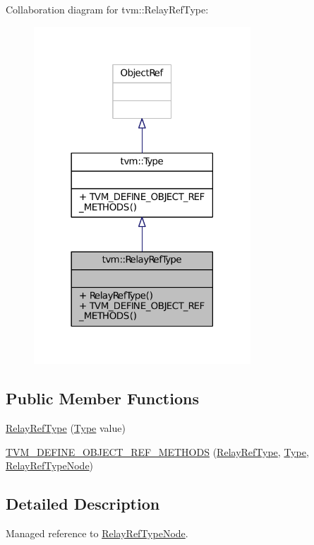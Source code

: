 Collaboration diagram for tvm\+:\+:Relay\+Ref\+Type\+:
\nopagebreak
\begin{figure}[H]
\begin{center}
\leavevmode
\includegraphics[width=230pt]{classtvm_1_1RelayRefType__coll__graph}
\end{center}
\end{figure}
\subsection*{Public Member Functions}
\begin{DoxyCompactItemize}
\item 
\hyperlink{classtvm_1_1RelayRefType_a91476d6d6cccf59283b4e024d1e8a663}{Relay\+Ref\+Type} (\hyperlink{classtvm_1_1Type}{Type} value)
\item 
\hyperlink{classtvm_1_1RelayRefType_a689969347ed8a75fa484b9b8b5e2875e}{T\+V\+M\+\_\+\+D\+E\+F\+I\+N\+E\+\_\+\+O\+B\+J\+E\+C\+T\+\_\+\+R\+E\+F\+\_\+\+M\+E\+T\+H\+O\+DS} (\hyperlink{classtvm_1_1RelayRefType}{Relay\+Ref\+Type}, \hyperlink{classtvm_1_1Type}{Type}, \hyperlink{classtvm_1_1RelayRefTypeNode}{Relay\+Ref\+Type\+Node})
\end{DoxyCompactItemize}


\subsection{Detailed Description}
Managed reference to \hyperlink{classtvm_1_1RelayRefTypeNode}{Relay\+Ref\+Type\+Node}. 

